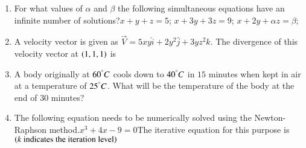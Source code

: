 \documentclass[journal,12pt,onecolumn]{IEEEtran}
\theoremstyle{remark}
\begin{document}
\begin{enumerate}
\item For what values of $\alpha$ and $\beta$ the following simultaneous equations have an infinite number of solutions?\newline $x+y+z=5$; $x+3y+3z=9$; $x+2y+\alpha z=\beta$;

\hfill{}
\begin{enumerate}
\end{enumerate}

\item A velocity vector is given as $\vec{V}=5xy\hat{i}+2y^2\hat{j}+3yz^2\hat{k}$. The divergence of this velocity vector at $\left(1,1,1\right)$ is

\hfill{}
\begin{enumerate}
\end{enumerate}

\item A body originally at $60^\degree C$ cools down to $40^\degree C$ in $15$ minutes when kept in air at a temperature of $25^\degree C$. What will be the temperature of the body at the end of $30$ minutes?

\hfill{}
\begin{enumerate}
\end{enumerate}

\item The following equation needs to be numerically solved using the Newton-Raphson method.\newline $x^3+4x-9=0$\newline The iterative equation for this purpose is $\left(k\text{ indicates the iteration level}\right)$ 


\end{enumerate}
\end{document}
